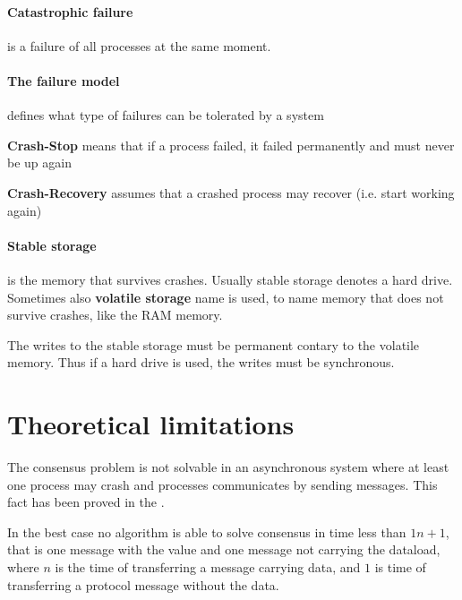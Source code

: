 \paragraph{Catastrophic failure} is a failure of all processes at the same moment.

\paragraph{The failure model}
defines what type of failures can be tolerated by a system
\begin{tightList}[ \setlength{\leftmargin}{2\leftmargin}]
 \item[\textbf{Crash-Stop}] means that if a process failed, it failed permanently and must never be up again
 \item[\textbf{Crash-Recovery}] assumes that a crashed process may recover (i.e. start working again)
\end{tightList}

\paragraph{Stable storage}
is the memory that survives crashes. Usually stable storage denotes a hard drive.
Sometimes also \textbf{volatile storage} name is used, to name memory that does not survive crashes, like the RAM memory.

\noindent The writes to the stable storage must be permanent contary to the volatile memory. Thus if a hard drive is used, the writes must be synchronous.

\section{Theoretical limitations}


The consensus problem is not solvable in an asynchronous system where at least one process may crash and processes communicates by sending messages. This fact has been proved in the \cite{FLP}.


In the best case no algorithm is able to solve consensus in time less than $1n+1$, that is one message with the value and one message not carrying the dataload, where $n$ is the time of transferring a message carrying data, and $1$ is time of transferring a protocol message without the data.

